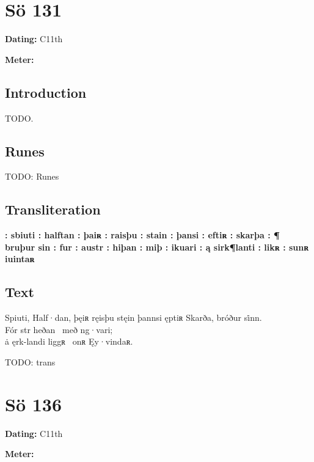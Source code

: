 \sectionline\clearpage


\section{Sö 131}

\begin{flushright}%
\textbf{Dating:} C11th

\textbf{Meter:} \Fornyrdislag
\end{flushright}%

\subsection{Introduction}

TODO.

\subsection{Runes}

TODO: Runes%

\subsection{Transliteration}

\textbf{: sbiuti : halftan : þaiʀ : raisþu : stain : þansi : eftiʀ : skarþa : ¶ bruþur sin : fur : austr : hiþan : miþ : ikuari : ą sirk¶lanti : likʀ : sunʀ iuintaʀ}

\subsection{Text}

\bpg\bpa[0]%
\startsub Spiuti, Half·dan, þęiʀ ręisþu stęin þannsi ęptiʀ Skarða, bróður si̇nn.\endsub \\
Fór str heðan \hld\ með ng·vari; \\
ȧ ęrk-landi liggʀ \hld\ onʀ Ęy·vindaʀ.\epa

\bpb TODO: trans\epb\epg

\sectionline\clearpage


\section{Sö 136}

\begin{flushright}%
\textbf{Dating:} C11th

\textbf{Meter:} \Fornyrdislag
\end{flushright}%

